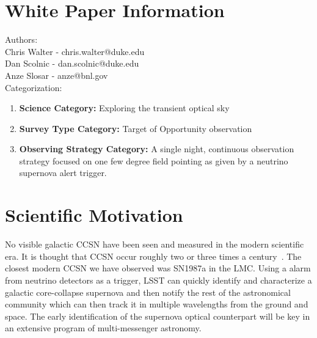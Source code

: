 \documentclass[12pt, letterpaper]{article}
\begin{document}
\section{White Paper Information}

\noindent
Authors: \\

\noindent
Chris Walter - chris.walter@duke.edu \\
Dan Scolnic - dan.scolnic@duke.edu \\
Anze Slosar - anze@bnl.gov \\

\noindent
Categorization: 
\begin{enumerate} 
\item {\bf Science Category:}  Exploring the transient optical sky
\item {\bf Survey Type Category:}  Target of Opportunity observation
\item {\bf Observing Strategy Category:}  A single night, continuous
  observation strategy focused on one few degree field pointing as given by
  a neutrino supernova alert trigger.
\end{enumerate}  

\clearpage

\section{Scientific Motivation}
\label{sec:motivation}

No visible galactic CCSN have been seen and measured in the modern
scientific era. It is thought that CCSN occur roughly two or three
times a century~\cite{1994ApJS...92..487T, 2001ASSL..264..199C}.  The
closest modern CCSN we have observed was SN1987a in the LMC.  Using a
alarm from neutrino detectors as a trigger, LSST can quickly identify
and characterize a galactic core-collapse supernova and then notify
the rest of the astronomical community which can then track it in
multiple wavelengths from the ground and space.  The early
identification of the supernova optical counterpart will be key in an
extensive program of multi-messenger astronomy.
\end{document}
